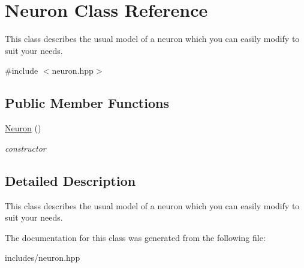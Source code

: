 \hypertarget{class_neuron}{}\section{Neuron Class Reference}
\label{class_neuron}


This class describes the usual model of a neuron which you can easily modify to suit your needs.  




{\ttfamily \#include $<$neuron.\+hpp$>$}

\subsection*{Public Member Functions}
\begin{DoxyCompactItemize}
\item 
\hypertarget{class_neuron_a823487d01615fadb8ac19a2768dd9d96}{}\hyperlink{class_neuron_a823487d01615fadb8ac19a2768dd9d96}{Neuron} ()\label{class_neuron_a823487d01615fadb8ac19a2768dd9d96}

\begin{DoxyCompactList}\small\item\em constructor \end{DoxyCompactList}\end{DoxyCompactItemize}


\subsection{Detailed Description}
This class describes the usual model of a neuron which you can easily modify to suit your needs. 

The documentation for this class was generated from the following file\+:\begin{DoxyCompactItemize}
\item 
includes/neuron.\+hpp\end{DoxyCompactItemize}
